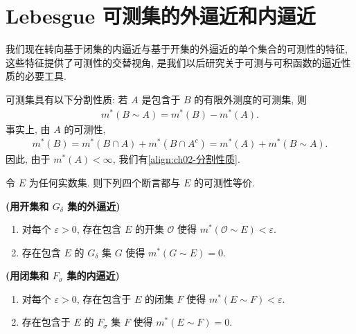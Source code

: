 \documentclass[../../main.tex]{subfiles}
\begin{document}
\section{Lebesgue 可测集的外逼近和内逼近}\label{section:ch02-内外逼近}

我们现在转向基于闭集的内逼近与基于开集的外逼近的单个集合的可测性的特征, 这些特征提供了可测性的交替视角, 是我们以后研究关于可测与可积函数的逼近性质的必要工具.

可测集具有以下分割性质: 若 $A$ 是包含于 $B$ 的有限外测度的可测集, 则
\begin{align}
m^{*}(B\sim A)=m^{*}(B)-m^{*}(A).\label{align:ch02-分割性质}
\end{align}
事实上, 由 $A$ 的可测性,
\begin{align*}
m^{*}(B)=m^{*}(B\cap A)+m^{*}(B\cap A^{c})=m^{*}(A)+m^{*}(B\sim A).
\end{align*}
因此, 由于 $m^{*}(A)<\infty$, 我们有\eqref{align:ch02-分割性质}.

\begin{theorem}\label{theorem:ch02-可测等价}
令 $E$ 为任何实数集. 则下列四个断言都与 $E$ 的可测性等价.

\textbf{(用开集和 $G_{\delta}$ 集的外逼近)}
\begin{enumerate}[label=(\roman*)]
\item 对每个 $\varepsilon>0$, 存在包含 $E$ 的开集 $\mathcal{O}$ 使得 $m^{*}(\mathcal{O}\sim E)<\varepsilon$.
\item 存在包含 $E$ 的 $G_{\delta}$ 集 $G$ 使得 $m^{*}(G\sim E)=0$.
\end{enumerate}

\textbf{(用闭集和 $F_{\sigma}$ 集的内逼近)}
\begin{enumerate}[label=(\roman*), start=3]
\item 对每个 $\varepsilon>0$, 存在包含于 $E$ 的闭集 $F$ 使得 $m^{*}(E\sim F)<\varepsilon$.
\item 存在包含于 $E$ 的 $F_{\sigma}$ 集 $F$ 使得 $m^{*}(E\sim F)=0$.
\end{enumerate}
\end{theorem}
\end{document}
